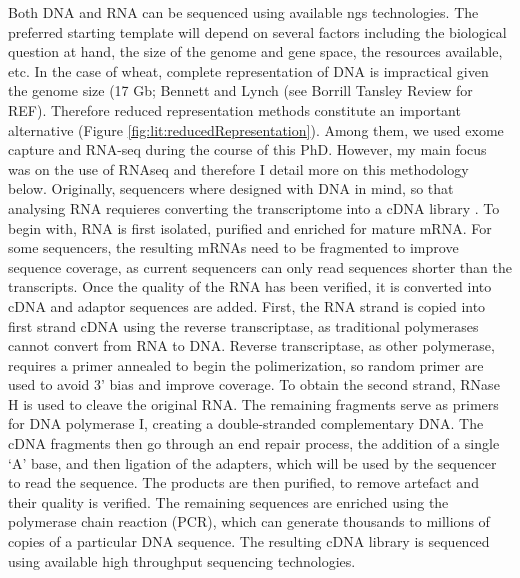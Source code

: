 Both DNA and RNA can be sequenced using available \gls{ngs} technologies. 
The preferred starting template will depend on several factors including the biological question at hand, the size of the genome and gene space, the resources available, etc. 
In the case of wheat, complete representation of DNA is impractical given the genome size (17 Gb; Bennett and Lynch (see Borrill Tansley Review for REF). 
Therefore reduced representation methods constitute an important alternative (Figure \ref{fig:lit:reducedRepresentation}). 
Among them, we used exome capture and RNA-seq during the course of this PhD. However, my main focus was on the use of RNAseq and therefore I detail more on this methodology below. 
Originally, sequencers where designed with DNA in mind, so that analysing RNA requieres converting the transcriptome into a cDNA library \cite{RNAseqlopedia, truseq}.
To begin with, RNA is first isolated, purified and enriched for mature mRNA.  
For some sequencers, the resulting mRNAs need to be fragmented to improve sequence coverage, as current sequencers can only read sequences shorter than the transcripts. 
Once the quality of the RNA has been verified, it is converted into cDNA and adaptor sequences are added. 
First, the RNA strand is copied into first strand cDNA using the reverse transcriptase, as traditional polymerases cannot convert from RNA to DNA\cite{alberts2014molecular}.
Reverse transcriptase, as other polymerase, requires a primer annealed to begin the polimerization, so random primer are used to avoid 3' bias and improve coverage\cite{RNAseqlopedia, truseq}.
To obtain the second strand, RNase H is used to cleave the original RNA. 
The remaining fragments serve as primers for DNA polymerase I, creating a double-stranded complementary DNA. 
The cDNA fragments then go through an end repair process, the addition of a single ‘A’ base, and then ligation of the adapters, which will be used by the sequencer to read the sequence. 
The products are then purified, to remove artefact and their quality is verified\cite{RNAseqlopedia, truseq}.
The remaining sequences are enriched using the polymerase chain reaction (PCR),  which can generate thousands to millions of copies of a particular DNA sequence\cite{RNAseqlopedia, truseq}.
The resulting cDNA library is sequenced using available high throughput sequencing technologies. 


